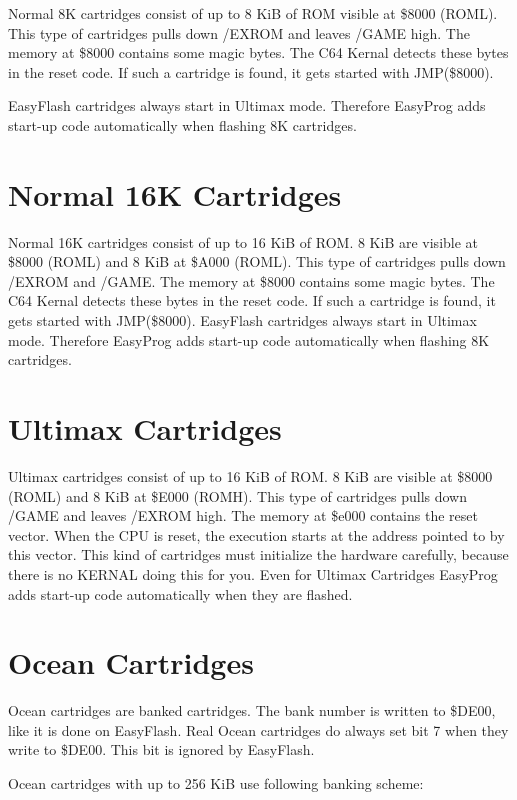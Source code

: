 \documentclass[a4paper,oneside]{memoir}
\begin{document}
Normal 8K cartridges consist of up to 8 KiB of ROM visible at \$8000 (ROML).
This type of cartridges pulls down /EXROM and leaves /GAME high.
The memory at \$8000 contains some magic bytes. The C64 Kernal detects these
bytes in the reset code. If such a cartridge is found, it gets started with
JMP(\$8000).

EasyFlash cartridges always start in Ultimax mode. Therefore EasyProg adds
start-up code automatically when flashing 8K cartridges.

\section{Normal 16K Cartridges}

Normal 16K cartridges consist of up to 16 KiB of ROM. 8 KiB are visible at
\$8000 (ROML) and 8 KiB at \$A000 (ROML). This type of cartridges pulls down
/EXROM and /GAME.
The memory at \$8000 contains some magic bytes. The C64 Kernal detects these
bytes in the reset code. If such a cartridge is found, it gets started with
JMP(\$8000).
EasyFlash cartridges always start in Ultimax mode. Therefore EasyProg adds
start-up code automatically when flashing 8K cartridges.

\section{Ultimax Cartridges}

Ultimax cartridges consist of up to 16 KiB of ROM. 8 KiB are visible at \$8000
(ROML) and 8 KiB at \$E000 (ROMH). This type of cartridges pulls down /GAME and
leaves /EXROM high.
The memory at \$e000 contains the reset vector. When the CPU is reset, the
execution starts at the address pointed to by this vector. This kind of
cartridges must initialize the hardware carefully, because there is no KERNAL
doing this for you.
Even for Ultimax Cartridges EasyProg adds start-up code automatically when they
are flashed.

\section{Ocean Cartridges}

Ocean cartridges are banked cartridges. The bank number is written to \$DE00,
like it is done on EasyFlash.
Real Ocean cartridges do always set bit 7 when they write to \$DE00. This bit
is ignored by EasyFlash.

Ocean cartridges with up to 256 KiB use following banking scheme:
\end{document}
